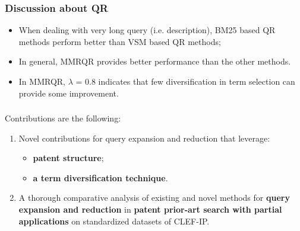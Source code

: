 \documentclass[xcolor=x11names,compress]{beamer}
\renewcommand{\(}{\begin{columns}}
\renewcommand{\)}{\end{columns}}
\newcommand{\<}[1]{\begin{column}{#1}}
\renewcommand{\>}{\end{column}}
\begin{document}

\begin{frame} 
\frametitle{Discussion about QR}

\begin{itemize}
\item When dealing with very long query (i.e. description), BM25
based QR methods perform better than VSM based QR methods;
 \item In general, MMRQR provides better performance than the other methods. 
 \item In MMRQR, $\lambda$ = 0.8 indicates that few diversification in
term selection can provide some improvement. 
\end{itemize}
\end{frame}


\begin{frame}
\frametitle{}

Contributions are the following: 
\begin{enumerate}
\item Novel contributions for query expansion and reduction that leverage:
	\begin{itemize} 
	\item \textbf{patent structure};
	\item \textbf{a term diversification technique}. 
	\end{itemize}
\item A thorough comparative analysis of existing and novel methods for
\textbf{query expansion and reduction} in \textbf{patent prior-art search with partial applications} on standardized
datasets of CLEF-IP. 
\end{enumerate}
\end{frame}
\end{document}
